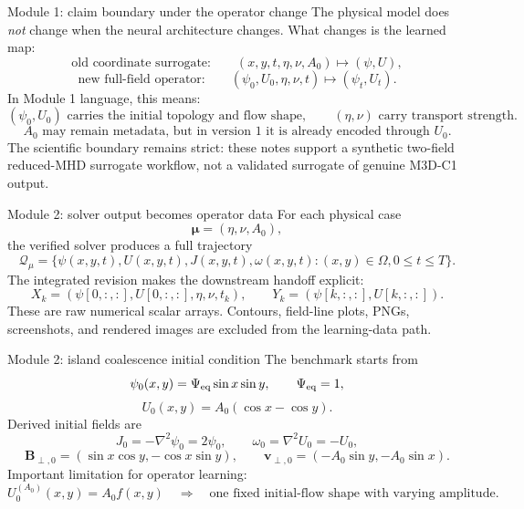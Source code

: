 \documentclass[aspectratio=169,11pt]{beamer}
\newcommand{\vect}[1]{\bm{#1}}
\newcommand{\stateop}{(\psi_0,U_0,\eta,\nu,t)\mapsto(\psi_t,U_t)}
\newcommand{\currentmodule}{Module 1}
\newcommand{\moduleprogress}{1 of 4}
\newcommand{\setmodule}[2]{%
  \renewcommand{\currentmodule}{#1}%
  \renewcommand{\moduleprogress}{#2}%
}
\begin{document}
\setmodule{Module 1}{4 of 4}
\begin{frame}[t]{Module 1: claim boundary under the operator change}
\vspace{-0.15em}
The physical model does \emph{not} change when the neural architecture changes. What changes is the learned map:
\[
\text{old coordinate surrogate:}\qquad (x,y,t,\eta,\nu,A_0)\mapsto(\psi,U),
\]
\[
\text{new full-field operator:}\qquad
\boxed{\stateop.}
\]
In Module 1 language, this means:
\[
(\psi_0,U_0)\text{ carries the initial topology and flow shape},
\qquad
(\eta,\nu)\text{ carry transport strength}.
\]
\[
A_0\text{ may remain metadata, but in version 1 it is already encoded through }U_0.
\]
The scientific boundary remains strict: these notes support a synthetic two-field reduced-MHD surrogate workflow, not a validated surrogate of genuine M3D-C1 output.
\end{frame}


\setmodule{Module 2}{1 of 4}
\begin{frame}[t]{Module 2: solver output becomes operator data}
\vspace{-0.15em}
For each physical case
\[
\vect\mu=(\eta,\nu,A_0),
\]
the verified solver produces a full trajectory
\[
\mathcal Q_\mu=\{\psi(x,y,t),U(x,y,t),J(x,y,t),\omega(x,y,t): (x,y)\in\Omega,
0\le t\le T\}.
\]
The integrated revision makes the downstream handoff explicit:
\[
\boxed{X_k=(\psi[0,:,:],U[0,:,:],\eta,\nu,t_k),
\qquad
Y_k=(\psi[k,:,:],U[k,:,:]).}
\]
These are raw numerical scalar arrays. Contours, field-line plots, PNGs, screenshots, and rendered images are excluded from the learning-data path.
\end{frame}

\setmodule{Module 2}{2 of 4}
\begin{frame}[t]{Module 2: island coalescence initial condition}
\vspace{-0.15em}
The benchmark starts from
\[
\psi_0(x,y)=\Psi_{\rm eq}\sin x\sin y,
\qquad
\Psi_{\rm eq}=1,
\]
\[
\boxed{U_0(x,y)=A_0(\cos x-\cos y).}
\]
Derived initial fields are
\[
J_0=-\nabla^2\psi_0=2\psi_0,
\qquad
\omega_0=\nabla^2U_0=-U_0,
\]
\[
\vect B_{\perp,0}=(\sin x\cos y,-\cos x\sin y),
\qquad
\vect v_{\perp,0}=(-A_0\sin y,-A_0\sin x).
\]
Important limitation for operator learning:
\[
U_0^{(A_0)}(x,y)=A_0 f(x,y)
\quad\Rightarrow\quad
\text{one fixed initial-flow shape with varying amplitude.}
\]
\end{frame}
\end{document}
